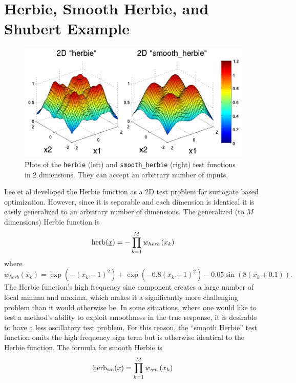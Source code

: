 \section{Herbie, Smooth Herbie, and Shubert Example}
\begin{figure}
\centering
\centerline{\includegraphics[scale=1.0]{images/DAK5pt2_2D__herbie__smooth_herbie}}
\caption{Plots of the \texttt{herbie} (left) and \texttt{smooth\_herbie} (right) test functions in 2 dimensions.  They can accept an arbitrary number of inputs.}
\label{fig:2D_herbie__smooth_herbie}
\end{figure}
Lee et al \cite{herbiefunc} %
developed the Herbie function as a 2D test problem for surrogate 
based optimization. However, since it is separable and each dimension is 
identical it is easily generalized to an arbitrary number of dimensions.  
The generalized (to $M$ dimensions) Herbie function is
\begin{displaymath}
{\rm herb}(\underline{x})=-\prod_{k=1}^M w_{herb}\left(x_k\right)
\end{displaymath}
where 
\begin{displaymath}
w_{herb}\left(x_k\right)=\exp(-(x_k-1)^2)+\exp(-0.8(x_k+1)^2)-0.05\sin\left(8\left(x_k+0.1\right)\right).
\end{displaymath}
The Herbie function's high frequency sine component creates a large 
number of local minima and maxima, which makes it a significantly 
more challenging problem than it would otherwise be.  In some 
situations, where one would like to test a method's ability to
exploit smoothness in the true response, it is desirable to have a
less oscillatory test problem.  For this reason, the ``smooth Herbie'' 
test function omits the high frequency sign term but is otherwise 
identical to the Herbie function.  The formula for smooth Herbie is
\begin{displaymath}
{\rm herb_{sm}}(\underline{x})=\prod_{k=1}^M w_{sm}\left(x_k\right)
\end{displaymath}
